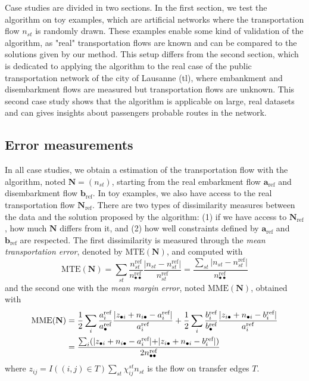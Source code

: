 \documentclass{bmcart}
\begin{document}
Case studies are divided in two sections. In the first section, we test the algorithm on toy examples, which are artificial networks where the transportation flow $n_{st}$ is randomly drawn. These examples enable some kind of validation of the algorithm, as "real" transportation flows are known and can be compared to the solutions given by our method. This setup differs from the second section, which is dedicated to applying the algorithm to the real case of the public transportation network of the city of Lausanne (tl), where embankment and disembarkment flows are measured but transportation flows are unknown. This second case study shows that the algorithm is applicable on large, real datasets and can gives insights about passengers probable routes in the network.

\subsection{Error measurements}
\label{error_measures}

In all case studies, we obtain a estimation of the transportation flow with the algorithm, noted $\mathbf{N} = (n_{st})$, starting from the real embarkment flow $\mathbf{a}_\text{ref}$ and disembarkment flow $\mathbf{b}_\text{ref}$. In toy examples, we also have access to the real transportation flow $\mathbf{N}_\text{ref}$. 
There are two types of dissimilarity measures between the data and the solution proposed by the algorithm: (1) if we have access to $\mathbf{N}_\text{ref}$, how much $\mathbf{N}$ differs from it, and (2) how well constraints defined by $\mathbf{a}_\text{ref}$ and $\mathbf{b}_\text{ref}$ are respected. The first dissimilarity is measured through the \emph{mean transportation error}, denoted by $\text{MTE}(\mathbf{N})$, and computed with
\begin{equation}
	\text{MTE}(\mathbf{N}) = \sum_{st} \frac{n^\text{ref}_{st}}{n^\text{ref}_{\bullet \bullet}} \frac{\lvert n_{st} - n^\text{ref}_{st}\lvert}{n^\text{ref}_{st}} = \frac{\sum_{st} \lvert n_{st} - n^\text{ref}_{st}\lvert}{n^\text{ref}_{\bullet \bullet}} 
	\label{MTE}
\end{equation} 
and the second one with the \emph{mean margin error}, noted $\text{MME}(\mathbf{N})$, obtained with
\begin{align}
	\text{MME}(\mathbf{N}) &= \frac{1}{2} \sum_{i} \frac{a^\text{ref}_i}{a^\text{ref}_\bullet} \frac{\lvert z_{\bullet i} + n_{i \bullet} - a^\text{ref}_i \lvert}{a^\text{ref}_i} + \frac{1}{2} \sum_{i} \frac{b^\text{ref}_i}{b^\text{ref}_\bullet} \frac{\lvert z_{i \bullet} + n_{\bullet i} - b^\text{ref}_i \lvert}{a^\text{ref}_i} \notag \\
	&= \frac{\sum_i (\lvert z_{\bullet i} + n_{i \bullet} - a^\text{ref}_i \lvert + \lvert z_{i \bullet} + n_{\bullet i} - b^\text{ref}_i \lvert)}{2n^\text{ref}_{\bullet \bullet}}
	\label{MME}
\end{align} 
where $z_{ij} = I((i,j) \in T)\sum_{st} \chi_{ij}^{st} n_{st}$ is the flow on transfer edges $T$. 
\end{document}
